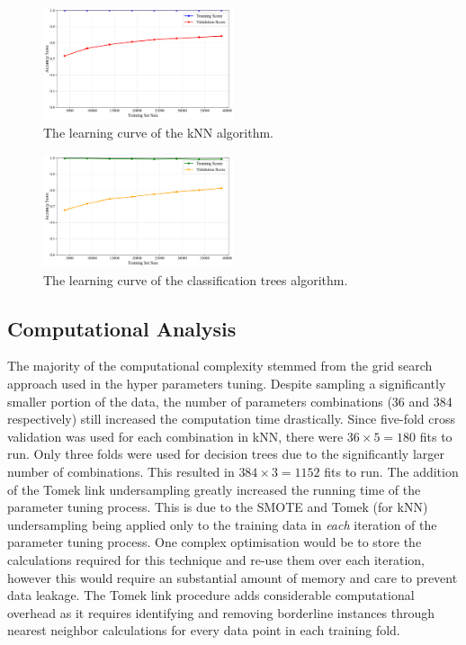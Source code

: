 \documentclass[10pt, conference]{IEEEtran}
\begin{document}
\begin{figure}[htbp]
	\centering
	\includegraphics[width=0.5\textwidth]{../plots/knn_learning_curve.pdf}
	\caption{The learning curve of the kNN algorithm.}
	\label{fig:knn-learning}
\end{figure}

\begin{figure}[htbp]
	\centering
	\includegraphics[width=0.5\textwidth]{../plots/dt_learning_curve.pdf}
	\caption{The learning curve of the classification trees algorithm.}
	\label{fig:dt-learning}
\end{figure}


\subsection{Computational Analysis}
The majority of the computational complexity stemmed from the grid search approach used in the hyper parameters tuning. Despite sampling a significantly smaller portion of the data, the number of parameters combinations (36 and 384 respectively)  still increased the computation time drastically. Since five-fold cross validation was used for each combination in kNN, there were $36 \times 5 = 180$ fits to run. Only three folds were used for decision trees due to the significantly larger number of combinations. This resulted in $384 \times 3 = 1152$ fits to run. The addition of the Tomek link undersampling greatly increased the running time of the parameter tuning process. This is due to the SMOTE and Tomek (for kNN) undersampling being applied only to the training data in \textit{each} iteration of the parameter tuning process. One complex optimisation would be to store the calculations required for this technique and re-use them over each iteration, however this would require an substantial amount of memory and care to prevent data leakage. The Tomek link procedure adds considerable computational overhead as it requires identifying and removing borderline instances through nearest neighbor calculations for every data point in each training fold.
\end{document}
